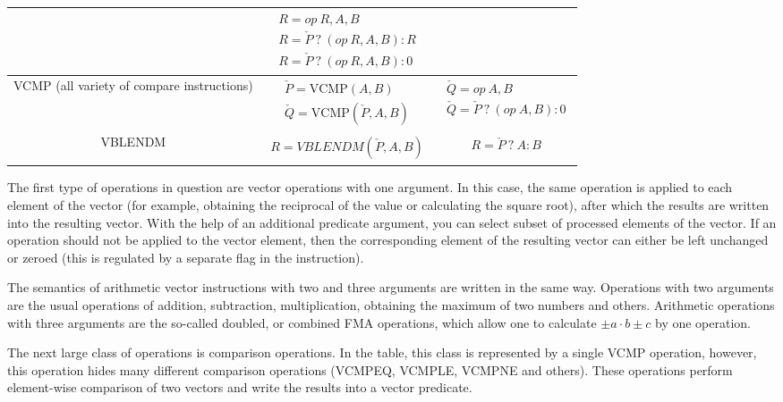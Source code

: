 \documentclass[
11pt,%
tightenlines,%
twoside,%
onecolumn,%
nofloats,%
nobibnotes,%
nofootinbib,%
superscriptaddress,%
noshowpacs,%
centertags]%
{revtex4}
\begin{document}
\begin{table}[!h]
\begin{tabular}{|c|c|c|}
& $\begin{matrix} R = op \ R, A, B \\ R = \check{P} \ ? \ (op \ R, A, B) : R \\ R = \check{P} \ ? \ (op \ R, A, B) : 0 \end{matrix}$ \\
\hline
\parbox{8cm}{VCMP (all variety of compare instructions)}
& $\begin{matrix} \check{P} = \text{VCMP}(A, B) \\ \check{Q} = \text{VCMP}(\check{P}, A, B) \end{matrix}$
& $\begin{matrix} \check{Q} = op \ A, B \\ \check{Q} = \check{P} \ ? \ (op \ A, B) : 0 \end{matrix}$ \\
\hline
\parbox{8cm}{VBLENDM}
& $\begin{matrix} R = VBLENDM(\check{P}, A, B) \end{matrix}$
& $\begin{matrix} R = \check{P} \ ? \ A : B \end{matrix}$ \\
\hline
\end{tabular}
\label{tab:avx512instructions}
\end{table}   

The first type of operations in question are vector operations with one argument.
In this case, the same operation is applied to each element of the vector (for example, obtaining the reciprocal of the value or calculating the square root), after which the results are written into the resulting vector.
With the help of an additional predicate argument, you can select subset of processed elements of the vector.
If an operation should not be applied to the vector element, then the corresponding element of the resulting vector can either be left unchanged or zeroed (this is regulated by a separate flag in the instruction).

The semantics of arithmetic vector instructions with two and three arguments are written in the same way.
Operations with two arguments are the usual operations of addition, subtraction, multiplication, obtaining the maximum of two numbers and others.
Arithmetic operations with three arguments are the so-called doubled, or combined FMA operations, which allow one to calculate $\pm a \cdot b \pm c$ by one operation.

The next large class of operations is comparison operations.
In the table, this class is represented by a single VCMP operation, however, this operation hides many different comparison operations (VCMPEQ, VCMPLE, VCMPNE and others).
These operations perform element-wise comparison of two vectors and write the results into a vector predicate.
\end{document}
